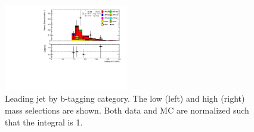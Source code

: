 \begin{figure}[htbp]
  \includegraphics[width=0.48\textwidth]{chapters/chapter5_yybb/images/data_MC_comparison/h_SR_h_2t_nominal_leadingJet_pt.pdf}
  \caption[Leading jet \pt.]{Leading jet \pt by b-tagging category. The low (left) and high (right) mass selections are shown. Both data and MC are normalized such that the integral is 1.
  \label{fig:jet_l_pt}}
\end{figure}

